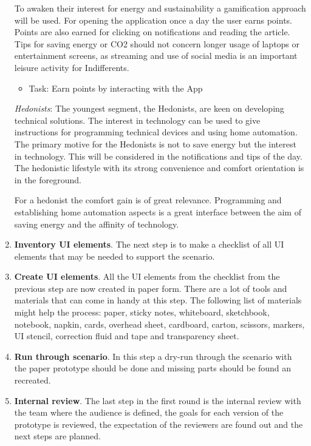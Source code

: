 \begin{enumerate}
	To awaken their interest for energy and sustainability a gamification approach will be used. For opening the application once a day the user earns points. Points are also earned for clicking on notifications and reading the article. Tips for saving energy or CO2 should not concern longer usage of laptops or entertainment screens, as streaming and use of social media is an important leisure activity for Indifferents.
	
	\begin{itemize}
		\item Task: Earn points by interacting with the App
	\end{itemize}
	
	\textit{Hedonists}:
	The youngest segment, the Hedonists, are keen on developing technical solutions. The interest in technology can be used to give instructions for programming technical devices and using home automation. The primary motive for the Hedonists is not to save energy but the interest in technology. This will be considered in the notifications and tips of the day. The hedonistic lifestyle with its strong convenience and comfort orientation is in the foreground.
	
	For a hedonist the comfort gain is of great relevance. Programming and establishing home automation aspects is a great interface between the aim of saving energy and the affinity of technology.
	
	
	\item \textbf{Inventory UI elements}. The next step is to make a checklist of all UI elements that may be needed to support the scenario.
	\item \textbf{Create UI elements}. All the UI elements from the checklist from the previous step are now created in paper form. There are a lot of tools and materials that can come in handy at this step. The following list of materials might help the process: paper, sticky notes,
	whiteboard, sketchbook, notebook, napkin, cards, overhead sheet, cardboard, carton, scissors, markers, UI stencil, correction fluid and tape and transparency sheet. 
	\item \textbf{Run through scenario}. In this step a dry-run through the scenario with the paper prototype should be done and missing parts should be found an recreated.
	\item \textbf{Internal review}. The last step in the first round is the internal review with the team where the audience is defined, the goals for each version of the prototype is reviewed, the expectation of the reviewers are found out and the next steps are planned.
\end{enumerate}

